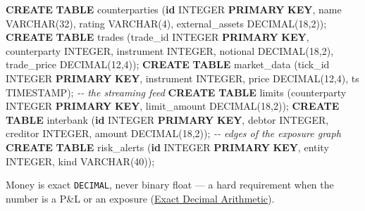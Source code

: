 \documentclass[
  11pt,
  openany]{book}
\newenvironment{Shaded}{}{}
\newcommand{\CommentTok}[1]{\textcolor[rgb]{0.38,0.63,0.69}{\textit{#1}}}
\newcommand{\DataTypeTok}[1]{\textcolor[rgb]{0.56,0.13,0.00}{#1}}
\newcommand{\DecValTok}[1]{\textcolor[rgb]{0.25,0.63,0.44}{#1}}
\newcommand{\KeywordTok}[1]{\textcolor[rgb]{0.00,0.44,0.13}{\textbf{#1}}}
\newcommand{\NormalTok}[1]{#1}
\begin{document}
\begin{Shaded}
\begin{Highlighting}[]
\KeywordTok{CREATE} \KeywordTok{TABLE}\NormalTok{ counterparties (}\KeywordTok{id} \DataTypeTok{INTEGER} \KeywordTok{PRIMARY} \KeywordTok{KEY}\NormalTok{, name }\DataTypeTok{VARCHAR}\NormalTok{(}\DecValTok{32}\NormalTok{),}
\NormalTok{    rating }\DataTypeTok{VARCHAR}\NormalTok{(}\DecValTok{4}\NormalTok{), external\_assets }\DataTypeTok{DECIMAL}\NormalTok{(}\DecValTok{18}\NormalTok{,}\DecValTok{2}\NormalTok{));}
\KeywordTok{CREATE} \KeywordTok{TABLE}\NormalTok{ trades (trade\_id }\DataTypeTok{INTEGER} \KeywordTok{PRIMARY} \KeywordTok{KEY}\NormalTok{, counterparty }\DataTypeTok{INTEGER}\NormalTok{,}
\NormalTok{    instrument }\DataTypeTok{INTEGER}\NormalTok{, notional }\DataTypeTok{DECIMAL}\NormalTok{(}\DecValTok{18}\NormalTok{,}\DecValTok{2}\NormalTok{), trade\_price }\DataTypeTok{DECIMAL}\NormalTok{(}\DecValTok{12}\NormalTok{,}\DecValTok{4}\NormalTok{));}
\KeywordTok{CREATE} \KeywordTok{TABLE}\NormalTok{ market\_data (tick\_id }\DataTypeTok{INTEGER} \KeywordTok{PRIMARY} \KeywordTok{KEY}\NormalTok{, instrument }\DataTypeTok{INTEGER}\NormalTok{,}
\NormalTok{    price }\DataTypeTok{DECIMAL}\NormalTok{(}\DecValTok{12}\NormalTok{,}\DecValTok{4}\NormalTok{), ts }\DataTypeTok{TIMESTAMP}\NormalTok{);              }\CommentTok{{-}{-} the streaming feed}
\KeywordTok{CREATE} \KeywordTok{TABLE}\NormalTok{ limits (counterparty }\DataTypeTok{INTEGER} \KeywordTok{PRIMARY} \KeywordTok{KEY}\NormalTok{, limit\_amount }\DataTypeTok{DECIMAL}\NormalTok{(}\DecValTok{18}\NormalTok{,}\DecValTok{2}\NormalTok{));}
\KeywordTok{CREATE} \KeywordTok{TABLE}\NormalTok{ interbank (}\KeywordTok{id} \DataTypeTok{INTEGER} \KeywordTok{PRIMARY} \KeywordTok{KEY}\NormalTok{, debtor }\DataTypeTok{INTEGER}\NormalTok{, creditor }\DataTypeTok{INTEGER}\NormalTok{,}
\NormalTok{    amount }\DataTypeTok{DECIMAL}\NormalTok{(}\DecValTok{18}\NormalTok{,}\DecValTok{2}\NormalTok{));                            }\CommentTok{{-}{-} edges of the exposure graph}
\KeywordTok{CREATE} \KeywordTok{TABLE}\NormalTok{ risk\_alerts (}\KeywordTok{id} \DataTypeTok{INTEGER} \KeywordTok{PRIMARY} \KeywordTok{KEY}\NormalTok{, entity }\DataTypeTok{INTEGER}\NormalTok{, kind }\DataTypeTok{VARCHAR}\NormalTok{(}\DecValTok{40}\NormalTok{));}
\end{Highlighting}
\end{Shaded}

Money is exact \texttt{DECIMAL}, never binary float --- a hard
requirement when the number is a P\&L or an exposure
(\href{../engine/data-types.md}{Exact Decimal Arithmetic}).
\end{document}
